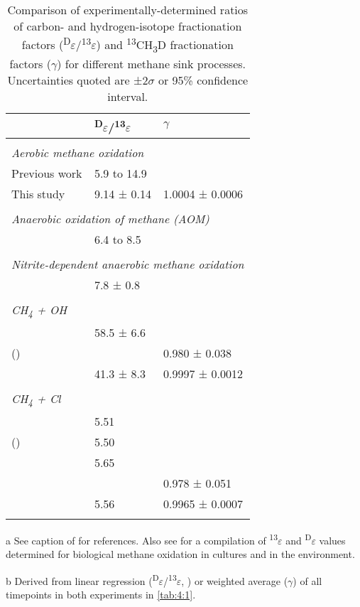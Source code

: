 
\begin{table}[t]
		\caption[Comparison of \textsuperscript{D}$\varepsilon$/\textsuperscript{13}$\varepsilon$ and $\gamma$ values for various methane sinks]{Comparison of experimentally-determined ratios of carbon- and
			hydrogen-isotope fractionation factors
			(\textsuperscript{D}$\varepsilon$/\textsuperscript{13}$\varepsilon$) and
			\textsuperscript{13}CH\textsubscript{3}D fractionation factors ($\gamma$) for
			different methane sink processes. Uncertainties quoted are ±2$\sigma$ or 95\%
			confidence interval.}
		\label{tab:4:2}
	\centering
	\begin{threeparttable}
		\begin{tabular}{lll}
			\toprule
			& \textsuperscript{D}$\varepsilon$/\textsuperscript{13}$\varepsilon$ & $\gamma$\tabularnewline
			\midrule
			& &\tabularnewline
			\multicolumn{3}{l}{\emph{Aerobic methane oxidation}}\tabularnewline
			Previous work\tnote{a} & 5.9 to 14.9 &\tabularnewline
			This study\tnote{b} & 9.14 ± 0.14 & 1.0004 ±
			0.0006\tabularnewline
			& &\tabularnewline
			\multicolumn{3}{l}{\emph{Anaerobic oxidation of methane (AOM)}}\tabularnewline
			\textcite{Holler++_2009_EMR} & 6.4 to 8.5 &\tabularnewline
			& &\tabularnewline
			\multicolumn{3}{l}{\emph{Nitrite-dependent anaerobic methane oxidation}}\tabularnewline
			\textcite{Rasigraf++_2012_GCA} & 7.8 ± 0.8 &\tabularnewline
			& &\tabularnewline
			\multicolumn{3}{l}{\emph{CH\textsubscript{4} + OH}} \tabularnewline
			\textcite{Saueressig++_2001_JGR} & 58.5 ± 6.6 &\tabularnewline
			\citeauthor{Joelsson++_2016_ACP} (\cite*{Joelsson++_2015_ACPD,Joelsson++_2016_ACP}) & & 0.980 ± 0.038\tabularnewline
			\textcite{Whitehill++_2017_GCA} & 41.3 ± 8.3 & 0.9997 ± 0.0012\tabularnewline
			& &\tabularnewline
			\multicolumn{3}{l}{\emph{CH\textsubscript{4} + Cl}}\tabularnewline
			\textcite{Tyler++_2000_GRL} & 5.51 &\tabularnewline
			\citeauthor{Saueressig++_1995_GRL} (\cite*{Saueressig++_1995_GRL,Saueressig++_1996_GRL}) & 5.50 &\tabularnewline
			\textcite{Feilberg++_2005_IJChemKin} & 5.65 &\tabularnewline
			\textcite{Joelsson++_2014_CPL} & & 0.978 ± 0.051\tabularnewline
			\textcite{Whitehill++_2017_GCA} & 5.56 & 0.9965 ± 0.0007\tabularnewline
			& &\tabularnewline
			\bottomrule
		\end{tabular}
		\begin{tablenotes}
			\item[a] See caption of  for references. Also see
			\textcite{Rasigraf++_2012_GCA} for a compilation of \textsuperscript{13}$\varepsilon$ and
			\textsuperscript{D}$\varepsilon$ values determined for biological methane oxidation
			in cultures and in the environment.
			\item[b] Derived from linear regression
			(\textsuperscript{D}$\varepsilon$/\textsuperscript{13}$\varepsilon$, ) or weighted
			average ($\gamma$) of all timepoints in both experiments in \autoref{tab:4:1}.
		\end{tablenotes}
	\end{threeparttable}

\end{table}
